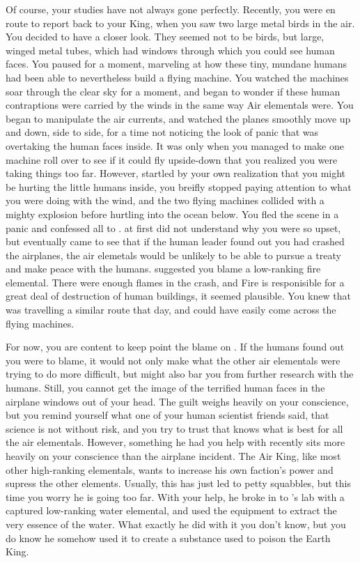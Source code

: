 \documentclass[char]{elementals}
\begin{document}
Of course, your studies have not always gone perfectly.  Recently, you were en route to report back to your King, when you saw two large metal birds in the air.  You decided to have a closer look.  They seemed not to be birds, but large, winged metal tubes, which had windows through which you could see human faces.  You paused for a moment, marveling at how these tiny, mundane humans had been able to nevertheless build a flying machine.  You watched the machines soar through the clear sky for a moment, and began to wonder if these human contraptions were carried by the winds in the same way Air elementals were.  You began to manipulate the air currents, and watched the planes smoothly move up and down, side to side, for a time not noticing the look of panic that was overtaking the human faces inside.  It was only when you managed to make one machine roll over to see if it could fly upside-down that you realized you were taking things too far.  However, startled by your own realization that you might be hurting the little humans inside, you breifly stopped paying attention to what you were doing with the wind, and the two flying machines collided with a mighty explosion before hurtling into the ocean below.  You fled the scene in a panic and confessed all to \cairKing{}.   at first did not understand why you were so upset, but eventually  came to see that if the human leader found out you had crashed the airplanes, the air elemetals would be unlikely to be able to pursue a treaty and make peace with the humans.  \cairKing{} suggested you blame a low-ranking fire elemental.  There were enough flames in the crash, and Fire is responisible for a great deal of destruction of human buildings, it seemed plausible.  You knew that  was travelling a similar route that day, and could have easily come across the flying machines.

For now, you are content to keep point the blame on .  If the humans found out you were to blame, it would not only make what the other air elementals were trying to do more difficult, but might also bar you from further research with the humans.  Still, you cannot get the image of the terrified human faces in the airplane windows out of your head.  The guilt weighs heavily on your conscience, but you remind yourself what one of your human scientist friends said, that science is not without risk, and you try to trust that \cKing{} knows what is best for all the air elementals.  However, something he had you help with recently sits more heavily on your conscience than the airplane incident.  The Air King, like most other high-ranking elementals, wants to increase his own faction's power and supress the other elements.  Usually, this has just led to petty squabbles, but this time you worry he is going too far.  With your help, he broke in to \cgrandDaughter{}'s lab with a captured low-ranking water elemental, and used the equipment to extract the very essence of the water.  What exactly he did with it you don't know, but you do know he somehow used it to create a substance used to poison the Earth King.  
\end{document}
